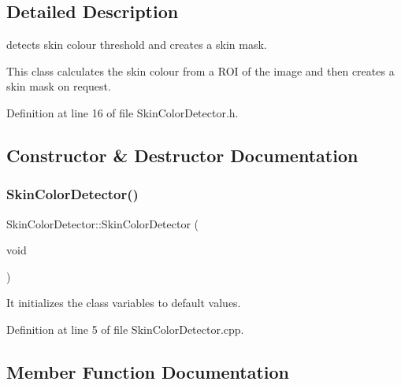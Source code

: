 \subsection{Detailed Description}
detects skin colour threshold and creates a skin mask. 

This class calculates the skin colour from a R\+OI of the image and then creates a skin mask on request. 

Definition at line 16 of file Skin\+Color\+Detector.\+h.



\subsection{Constructor \& Destructor Documentation}
\mbox{\label{class_gesture_detection_1_1_skin_color_detector_ab059f7f926aac46a712db749b4df4f27}} 
\subsubsection{\texorpdfstring{Skin\+Color\+Detector()}{SkinColorDetector()}}
{\footnotesize\ttfamily Skin\+Color\+Detector\+::\+Skin\+Color\+Detector (\begin{DoxyParamCaption}\item[{void}]{ }\end{DoxyParamCaption})}

It initializes the class variables to default values. 

Definition at line 5 of file Skin\+Color\+Detector.\+cpp.



\subsection{Member Function Documentation}
\mbox{\label{class_gesture_detection_1_1_skin_color_detector_abcb6b9a3ef251dbafb6bca73ae0929f8}} 
